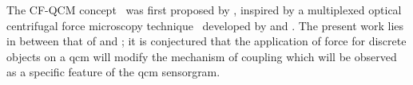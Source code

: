 The CF-QCM concept~\cite{webster2013qcm} was first proposed by
, inspired by a multiplexed optical centrifugal force microscopy
technique~\cite{halvorsen2010massively} developed by  and
.  The present work lies in between that of 
and ; it is conjectured that the application of force for
discrete objects on a \gls{qcm} will modify the mechanism of coupling which will
be observed as a specific feature of the \gls{qcm} sensorgram.
